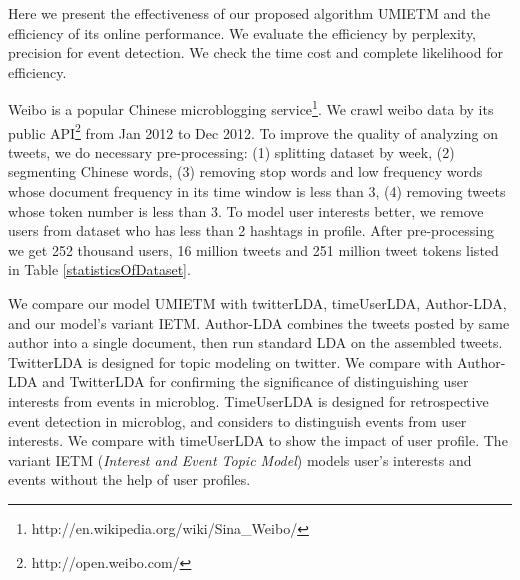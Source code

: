 \documentclass[conference,compsoc]{IEEEtran}
\begin{document}
Here we present the effectiveness of our proposed algorithm UMIETM and the efficiency of its online performance.
We evaluate the efficiency by perplexity, precision for event detection. 
We check the time cost and complete likelihood for efficiency.

Weibo is a popular Chinese microblogging service\footnote{http://en.wikipedia.org/wiki/Sina\_Weibo/}.
We crawl weibo data by  its public API\footnote{http://open.weibo.com/} from Jan 2012 to Dec 2012.
To improve the quality of analyzing on tweets, we do necessary pre-processing: (1) splitting dataset by week, (2) segmenting Chinese words, (3) removing stop words and low frequency words whose document frequency in its time window is less than 3, (4) removing tweets whose token number is less than 3.
To model user interests better,  we remove users from dataset who has less than 2 hashtags in profile.
After pre-processing we get 252 thousand users, 16 million tweets and 251 million tweet tokens listed in Table \ref{statisticsOfDataset}.

We compare our model UMIETM with twitterLDA, timeUserLDA, Author-LDA, and our model's variant IETM.
Author-LDA combines the tweets posted by same author into a single document, then run standard LDA on the assembled tweets.
TwitterLDA is designed for topic modeling on twitter.
We compare with Author-LDA and TwitterLDA for confirming the significance of distinguishing user interests from events in microblog.
TimeUserLDA is designed for retrospective event detection in microblog, and considers to distinguish events from user interests.
We compare with timeUserLDA to show the impact of user profile.
The variant IETM (\textit{Interest and Event Topic Model}) models user's interests and events without the help of user profiles.

\end{document}

